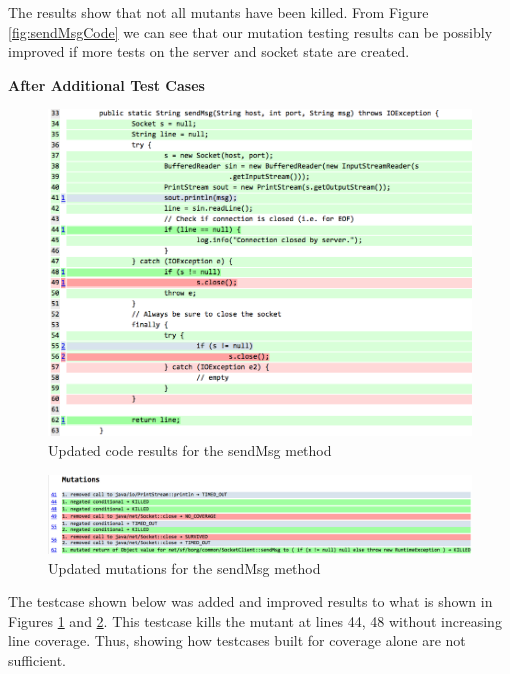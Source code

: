 \documentclass[fontsize=12pt,paper=letter,twoside]{scrartcl}
\begin{document}
\clearpage
The results show that not all mutants have been killed. From Figure \ref{fig:sendMsgCode} we can see that our mutation testing results can be possibly improved if more tests on the server and socket state are created. 

\bigskip

\fontsize{14}{5}\textbf{After Additional Test Cases}

\begin{figure}[!htb]
\begin{center}
\includegraphics[width=.99\textwidth]{images/MutationTesting/sendMsgCodeAfter.png}
\end{center}
\caption{Updated code results for the sendMsg method}
\label{fig:sendMsgCodeAfter}
\end{figure}

\begin{figure}[!htb]
\begin{center}
\includegraphics[width=.99\textwidth]{images/MutationTesting/sendMsgMutantAfter.png}
\end{center}
\caption{Updated mutations for the sendMsg method}
\label{fig:sendMsgMutantAfter}
\end{figure}

The testcase shown below was added and improved results to what is shown in Figures \ref{fig:sendMsgCodeAfter} and \ref{fig:sendMsgMutantAfter}. This testcase kills the mutant at lines 44, 48 without increasing line coverage. Thus, showing how testcases built for coverage alone are not sufficient. \\
\end{document}
